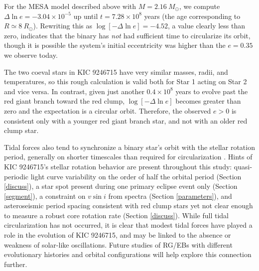 For the MESA model described above with $M = 2.16 \ M_{\odot}$, we compute $\Delta \ln e = -3.04 \times 10^{-5}$ up until $t = 7.28 \times 10^8$ years (the age corresponding to $R \simeq 8 \ R_{\odot}$). Rewriting this as $\log [-\Delta \ln e] = -4.52$, a value clearly less than zero, indicates that the binary has \emph{not} had sufficient time to circularize its orbit, though it is possible the system's initial eccentricity was higher than the $e = 0.35$ we observe today.

The two coeval stars in KIC 9246715 have very similar masses, radii, and temperatures, so this rough calculation is valid both for Star 1 acting on Star 2 and vice versa. In contrast, given just another $0.4 \times 10^8$ years to evolve past the red giant branch toward the red clump, $\log [-\Delta \ln e]$ becomes greater than zero and the expectation is a circular orbit. Therefore, the observed $e > 0$ is consistent only with a younger red giant branch star, and not with an older red clump star.

Tidal forces also tend to synchronize a binary star's orbit with the stellar rotation period, generally on shorter timescales than required for circularization \citep{ogi14}. Hints of KIC 9246715's stellar rotation behavior are present throughout this study: quasi-periodic light curve variability on the order of half the orbital period (Section \ref{discuss}), a star spot present during one primary eclipse event only (Section \ref{segment}), a constraint on $v \sin i$ from spectra (Section \ref{parameters}), and asteroseismic period spacing consistent with red clump stars yet not clear enough to measure a robust core rotation rate (Section \ref{discuss}). While full tidal circularization has not occurred, it is clear that modest tidal forces have played a role in the evolution of KIC 9246715, and may be linked to the absence or weakness of solar-like oscillations. Future studies of RG/EBs with different evolutionary histories and orbital configurations will help explore this connection further.

  
  
  
  
  